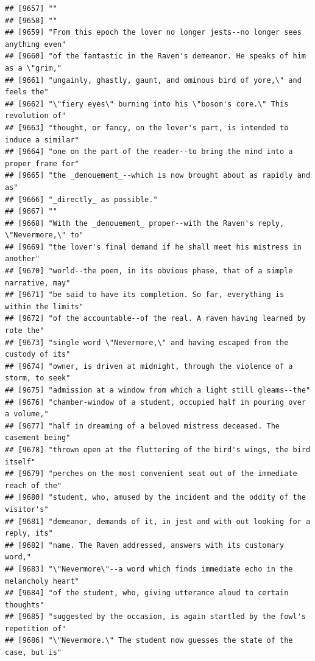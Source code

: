 \documentclass{article}\usepackage[]{graphicx}\usepackage[]{color}
\makeatletter
\newenvironment{kframe}{%
 \def\at@end@of@kframe{}%
 \ifinner\ifhmode%
  \def\at@end@of@kframe{\end{minipage}}%
  \begin{minipage}{\columnwidth}%
 \fi\fi%
 \def\FrameCommand##1{\hskip\@totalleftmargin \hskip-\fboxsep
 \colorbox{shadecolor}{##1}\hskip-\fboxsep
     \hskip-\linewidth \hskip-\@totalleftmargin \hskip\columnwidth}%
 \MakeFramed {\advance\hsize-\width
   \@totalleftmargin\z@ \linewidth\hsize
   \@setminipage}}%
 {\par\unskip\endMakeFramed%
 \at@end@of@kframe}
\newenvironment{knitrout}{}{} %
\makeatother
\begin{document}
\begin{knitrout}
\begin{kframe}
\begin{verbatim}
## [9657] ""                                                                            
## [9658] ""                                                                            
## [9659] "From this epoch the lover no longer jests--no longer sees anything even"     
## [9660] "of the fantastic in the Raven's demeanor. He speaks of him as a \"grim,"     
## [9661] "ungainly, ghastly, gaunt, and ominous bird of yore,\" and feels the"         
## [9662] "\"fiery eyes\" burning into his \"bosom's core.\" This revolution of"        
## [9663] "thought, or fancy, on the lover's part, is intended to induce a similar"     
## [9664] "one on the part of the reader--to bring the mind into a proper frame for"    
## [9665] "the _denouement_--which is now brought about as rapidly and as"              
## [9666] "_directly_ as possible."                                                     
## [9667] ""                                                                            
## [9668] "With the _denouement_ proper--with the Raven's reply, \"Nevermore,\" to"     
## [9669] "the lover's final demand if he shall meet his mistress in another"           
## [9670] "world--the poem, in its obvious phase, that of a simple narrative, may"      
## [9671] "be said to have its completion. So far, everything is within the limits"     
## [9672] "of the accountable--of the real. A raven having learned by rote the"         
## [9673] "single word \"Nevermore,\" and having escaped from the custody of its"       
## [9674] "owner, is driven at midnight, through the violence of a storm, to seek"      
## [9675] "admission at a window from which a light still gleams--the"                  
## [9676] "chamber-window of a student, occupied half in pouring over a volume,"        
## [9677] "half in dreaming of a beloved mistress deceased. The casement being"         
## [9678] "thrown open at the fluttering of the bird's wings, the bird itself"          
## [9679] "perches on the most convenient seat out of the immediate reach of the"       
## [9680] "student, who, amused by the incident and the oddity of the visitor's"        
## [9681] "demeanor, demands of it, in jest and with out looking for a reply, its"      
## [9682] "name. The Raven addressed, answers with its customary word,"                 
## [9683] "\"Nevermore\"--a word which finds immediate echo in the melancholy heart"    
## [9684] "of the student, who, giving utterance aloud to certain thoughts"             
## [9685] "suggested by the occasion, is again startled by the fowl's repetition of"    
## [9686] "\"Nevermore.\" The student now guesses the state of the case, but is"        

\end{verbatim}
\end{kframe}
\end{knitrout}
\end{document}
